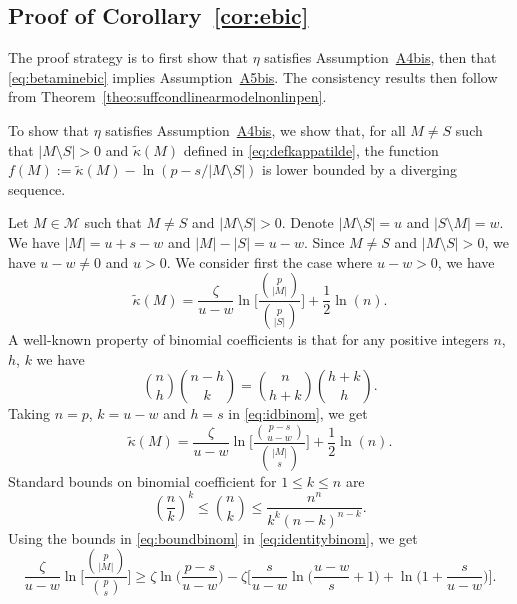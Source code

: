 \documentclass[
  12pt]{article}
\newcommand{\M}{\mathcal{M}}
\begin{document}
\subsection{Proof of Corollary~\ref{cor:ebic}}
The proof strategy is to first show that $\eta$ satisfies Assumption~\hyperlink{lab:A4bis}{A4bis}, then that \eqref{eq:betaminebic} implies Assumption~\hyperlink{lab:A5bis}{A5bis}. The consistency results then follow from Theorem~\ref{theo:suffcondlinearmodelnonlinpen}.

To show that $\eta$ satisfies Assumption~\hyperlink{lab:A4bis}{A4bis}, we show that, for all $M\neq S$ such that $|M\setminus S|>0$ and $\tilde{\kappa}(M)$ defined in \eqref{eq:defkappatilde}, the function $f(M):=\tilde{\kappa}(M)-\ln(p-s/|M\setminus S|)$ is lower bounded by a diverging sequence. 

Let $M\in\M$ such that $M\neq S$ and $|M\setminus S|>0$. Denote $|M\setminus S|=u$ and $|S\setminus M|=w$. We have $|M|=u+s-w$ and $|M|-|S|=u-w$. Since $M\neq S$ and $|M\setminus S|>0$, we have $u- w\neq0$ and $u>0$. We consider first the case where $u-w>0$, we have
    \begin{equation*}
        \tilde{\kappa}(M)=\frac{\zeta}{u-w}\ln\Bigg[\frac{\binom{p}{|M|}}{\binom{p}{|S|}}\Bigg]+ \frac{1}{2}\ln(n).
    \end{equation*}
    A well-known property of binomial coefficients is that for any positive integers $n$, $h$, $k$ we have
    \begin{equation}\label{eq:idbinom}
        \binom{n}{h}\binom{n-h}{k}=\binom{n}{h+k}\binom{h+k}{h}.
    \end{equation}
    Taking $n=p$, $k=u-w$ and $h=s$ in \eqref{eq:idbinom}, we get
    \begin{equation}\label{eq:identitybinom}
        \tilde{\kappa}(M)=\frac{\zeta}{u-w}\ln\bigg[\frac{\binom{p -s}{u-w}}{\binom{|M|}{s}}\bigg]+ \frac{1}{2}\ln(n).
    \end{equation}
Standard bounds on binomial coefficient for $1\leq k\leq n$ are
\begin{equation}\label{eq:boundbinom}
  \left(\frac{n}{k}\right)^k \leq  \binom{n}{k} \leq \frac{n^n}{k^k(n-k)^{n-k}}.
\end{equation}
Using the bounds in \eqref{eq:boundbinom} in \eqref{eq:identitybinom}, we get
\begin{equation}\label{eq:gggg}
    \frac{\zeta}{u-w}\ln\bigg[\frac{\binom{p}{|M|}}{\binom{p}{s}}\bigg] \geq \zeta\ln\bigg(\frac{p-s}{u-w}\bigg)-\zeta\bigg[\frac{s}{u-w}\ln\bigg(\frac{u-w}{s}+1\bigg) +\ln\bigg(1+\frac{s}{u-w}\bigg) \bigg].
\end{equation}
\end{document}
